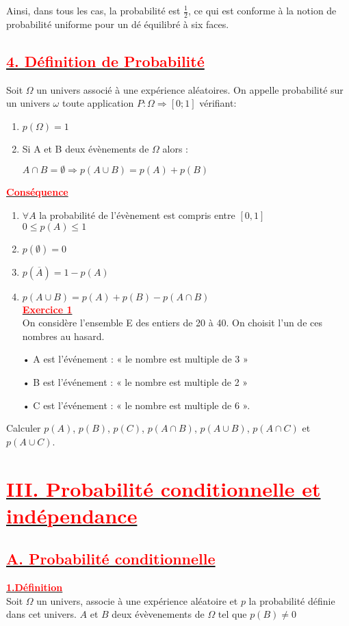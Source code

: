 \documentclass[12pt]{article}
\begin{document}
Ainsi, dans tous les cas, la probabilité est $\frac{1}{2}$, ce qui est conforme à la notion de probabilité uniforme pour un dé équilibré à six faces.
\subsection*{\underline{\textbf{\textcolor{red}{4. Définition de Probabilité}}}}
Soit $\Omega$ un univers associé à une expérience aléatoires.
On appelle probabilité sur un univers $\omega$ toute application 
$P:\Omega \Longrightarrow [0;1]$ vérifiant:
\begin{enumerate}
\item $p(\Omega)=1$
\item Si A et B deux évènements de $\Omega$ alors :

$A\cap B=\emptyset \Longrightarrow p(A\cup B)=p(A)+p(B)$
\end{enumerate}
\underline{\textbf{\textcolor{red}{Conséquence}}}\\
\begin{enumerate}
\item $\forall A$ la probabilité de l'évènement est compris entre $[0,1]$\\
$0 \leq p(A)\leq 1$
\item $p(\emptyset)=0$
\item$p(\overline{A})=1-p(A)$
\item $p(A \cup B)=p(A)+p(B)-p(A\cap B)$\\
\underline{\textbf{\textcolor{red}{Exercice 1}}}\\
On considère l’ensemble E des entiers de 20 à 40. On choisit l’un de ces nombres au hasard.
\end{enumerate}
\begin{itemize}
\item[•] A est l’événement : « le nombre est multiple de 3 »
\item[•] B est l’événement : « le nombre est multiple de 2 »
\item[•] C est l’événement : « le nombre est multiple de 6 ».
\end{itemize}
Calculer $p(A)$, $p(B)$, $p(C)$, $p(A\cap B)$, $p(A\cup B)$, $p(A\cap C)$ et $p(A\cup C)$.

\section*{\underline{\textbf{\textcolor{red}{III. Probabilité conditionnelle et indépendance}}}}
\subsection*{\underline{\textbf{\textcolor{red}{A. Probabilité conditionnelle}}}}
\underline{\textbf{\textcolor{red}{1.Définition}}}\\
Soit $\Omega$ un univers, associe à une expérience aléatoire et $p$ la probabilité définie dans cet univers. $A$ et $B$ deux évèvenements de $\Omega$ tel que $p(B)\neq 0$
\end{document}
